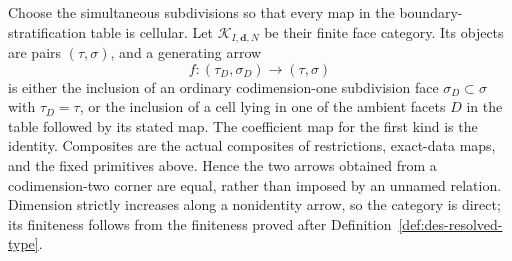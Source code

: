 Choose the simultaneous subdivisions so that every map in the
boundary-stratification table is
cellular.  Let $\mathcal K_{I,\mathbf d,N}$ be their finite face category.
Its objects are pairs $(\tau,\sigma)$, and a generating arrow
\begin{equation}
 f:(\tau_D,\sigma_D)\longrightarrow(\tau,\sigma)
 \label{eq:des-face-arrow}
\end{equation}
is either the inclusion of an ordinary codimension-one subdivision face
$\sigma_D\subset\sigma$ with $\tau_D=\tau$, or the inclusion of a cell lying
in one of the ambient facets $D$ in the table followed by its stated map.
The coefficient map for the first kind is the identity.  Composites are the
actual composites of restrictions, exact-data maps, and the fixed primitives
above.  Hence the two arrows obtained from a codimension-two corner are equal,
rather than imposed by an unnamed relation.  Dimension strictly increases
along a nonidentity arrow, so the category is direct; its finiteness follows
from the finiteness proved after Definition~\ref{def:des-resolved-type}.

